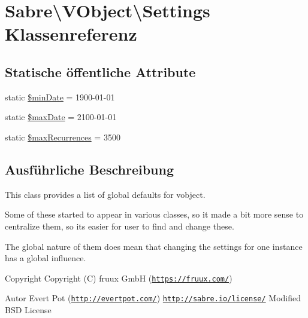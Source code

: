 \hypertarget{class_sabre_1_1_v_object_1_1_settings}{}\section{Sabre\textbackslash{}V\+Object\textbackslash{}Settings Klassenreferenz}
\label{class_sabre_1_1_v_object_1_1_settings}
\subsection*{Statische öffentliche Attribute}
\begin{DoxyCompactItemize}
\item 
static \mbox{\hyperlink{class_sabre_1_1_v_object_1_1_settings_af44461f32762ddf79f5721235618a1ca}{\$min\+Date}} = \textquotesingle{}1900-\/01-\/01\textquotesingle{}
\item 
static \mbox{\hyperlink{class_sabre_1_1_v_object_1_1_settings_ab800269b5df1a028397507346f162bcf}{\$max\+Date}} = \textquotesingle{}2100-\/01-\/01\textquotesingle{}
\item 
static \mbox{\hyperlink{class_sabre_1_1_v_object_1_1_settings_ae70079c375fb5e7199334830e4e58aa4}{\$max\+Recurrences}} = 3500
\end{DoxyCompactItemize}


\subsection{Ausführliche Beschreibung}
This class provides a list of global defaults for vobject.

Some of these started to appear in various classes, so it made a bit more sense to centralize them, so it\textquotesingle{}s easier for user to find and change these.

The global nature of them does mean that changing the settings for one instance has a global influence.

\begin{DoxyCopyright}{Copyright}
Copyright (C) fruux GmbH (\href{https://fruux.com/}{\tt https\+://fruux.\+com/}) 
\end{DoxyCopyright}
\begin{DoxyAuthor}{Autor}
Evert Pot (\href{http://evertpot.com/}{\tt http\+://evertpot.\+com/})  \href{http://sabre.io/license/}{\tt http\+://sabre.\+io/license/} Modified B\+SD License 
\end{DoxyAuthor}



